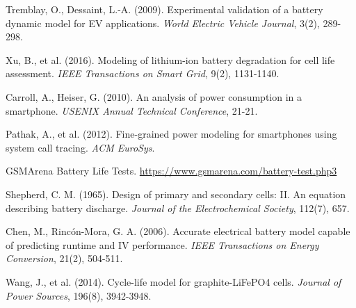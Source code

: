 \documentclass[12pt]{article}
\begin{document}
\begin{enumerate}[label={[\arabic*]}]
    \item Tremblay, O., Dessaint, L.-A. (2009). Experimental validation of a battery dynamic model for EV applications. \textit{World Electric Vehicle Journal}, 3(2), 289-298.
    
    \item Xu, B., et al. (2016). Modeling of lithium-ion battery degradation for cell life assessment. \textit{IEEE Transactions on Smart Grid}, 9(2), 1131-1140.
    
    \item Carroll, A., Heiser, G. (2010). An analysis of power consumption in a smartphone. \textit{USENIX Annual Technical Conference}, 21-21.
    
    \item Pathak, A., et al. (2012). Fine-grained power modeling for smartphones using system call tracing. \textit{ACM EuroSys}.
    
    \item GSMArena Battery Life Tests. \url{https://www.gsmarena.com/battery-test.php3}
    
    \item Shepherd, C. M. (1965). Design of primary and secondary cells: II. An equation describing battery discharge. \textit{Journal of the Electrochemical Society}, 112(7), 657.
    
    \item Chen, M., Rincón-Mora, G. A. (2006). Accurate electrical battery model capable of predicting runtime and IV performance. \textit{IEEE Transactions on Energy Conversion}, 21(2), 504-511.
    
    \item Wang, J., et al. (2014). Cycle-life model for graphite-LiFePO4 cells. \textit{Journal of Power Sources}, 196(8), 3942-3948.
\end{enumerate}
\end{document}
